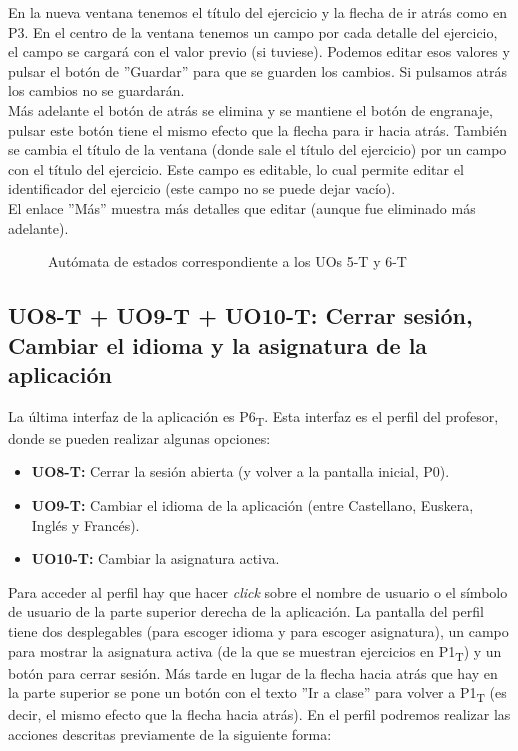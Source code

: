 En la nueva ventana tenemos el título del ejercicio y la flecha de ir atrás como en P3. En el centro de la ventana tenemos un campo por cada detalle del ejercicio, el campo se cargará con el valor previo (si tuviese). Podemos editar esos valores y pulsar el botón de ''Guardar'' para que se guarden los cambios. Si pulsamos atrás los cambios no se guardarán.\\

Más adelante el botón de atrás se elimina y se mantiene el botón de engranaje, pulsar este botón tiene el mismo efecto que la flecha para ir hacia atrás. También se cambia el título de la ventana (donde sale el título del ejercicio) por un campo con el título del ejercicio. Este campo es editable, lo cual permite editar el identificador del ejercicio (este campo no se puede dejar vacío).\\

El enlace ''Más'' muestra más detalles que editar (aunque fue eliminado más adelante).\\

\noindent
\begin{figure}[!htbp]
\noindent
{}
\caption{Autómata de estados correspondiente a los UOs 5-T y 6-T}
\label{fig:analisis-de-requisitos:funcionales:uo6t:fsm}
\end{figure}

\subsection{UO8-T + UO9-T + UO10-T: Cerrar sesión, Cambiar el idioma y la asignatura de la aplicación}
\label{analisis-de-requisitos:funcionales:uo8t}

La última interfaz de la aplicación es P6\textsubscript{T}. Esta interfaz es el perfil del profesor, donde se pueden realizar algunas opciones:
\begin{itemize}
\item \textbf{UO8-T:} Cerrar la sesión abierta (y volver a la pantalla inicial, P0).
\item \textbf{UO9-T:} Cambiar el idioma de la aplicación (entre Castellano, Euskera, Inglés y Francés).
\item \textbf{UO10-T:} Cambiar la asignatura activa.
\end{itemize}

Para acceder al perfil hay que hacer \textit{click} sobre el nombre de usuario o el símbolo de usuario de la parte superior derecha de la aplicación. La pantalla del perfil tiene dos desplegables (para escoger idioma y para escoger asignatura), un campo para mostrar la asignatura activa (de la que se muestran ejercicios en P1\textsubscript{T}) y un botón para cerrar sesión. Más tarde en lugar de la flecha hacia atrás que hay en la parte superior se pone un botón con el texto ''Ir a clase'' para volver a P1\textsubscript{T} (es decir, el mismo efecto que la flecha hacia atrás). En el perfil podremos realizar las acciones descritas previamente de la siguiente forma:

